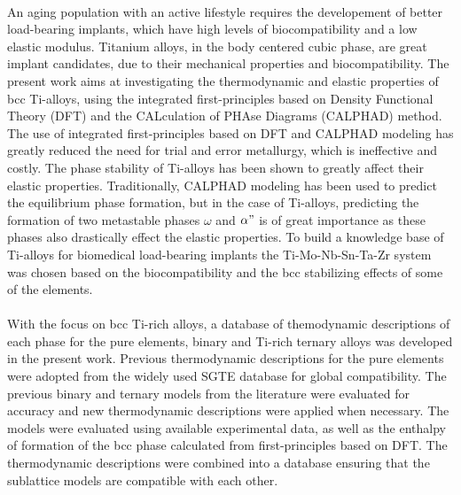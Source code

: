 \paragraph*{} An aging population with an active lifestyle requires the developement of better load-bearing implants, which have high levels of biocompatibility and a low elastic modulus. Titanium alloys, in the body centered cubic phase, are great implant candidates, due to their mechanical properties and biocompatibility. The present work aims at investigating the thermodynamic and elastic properties of bcc Ti-alloys, using the integrated first-principles based on Density Functional Theory (DFT) and the CALculation of PHAse Diagrams (CALPHAD) method. The use of integrated first-principles based on DFT and CALPHAD modeling has greatly reduced the need for trial and error metallurgy, which is ineffective and costly. The phase stability of Ti-alloys has been shown to greatly affect their elastic properties. Traditionally, CALPHAD modeling has been used to predict the equilibrium phase formation, but in the case of Ti-alloys, predicting the formation of two metastable phases $\omega$ and $\alpha"$ is of great importance as these phases also drastically effect the elastic properties. To build a knowledge base of Ti-alloys for biomedical load-bearing implants the Ti-Mo-Nb-Sn-Ta-Zr system was chosen based on the biocompatibility and the bcc stabilizing effects of some of the elements.
\paragraph*{} With the focus on bcc Ti-rich alloys, a database of themodynamic descriptions of each phase for the pure elements, binary and Ti-rich ternary alloys was developed in the present work. Previous thermodynamic descriptions for the pure elements were adopted from the widely used SGTE database for global compatibility. The previous binary and ternary models from the literature were evaluated for accuracy and new thermodynamic descriptions were applied when necessary. The models were evaluated using available experimental data, as well as the enthalpy of formation of the bcc phase calculated from first-principles based on DFT. The thermodynamic descriptions were combined into a database ensuring that the sublattice models are compatible with each other.
